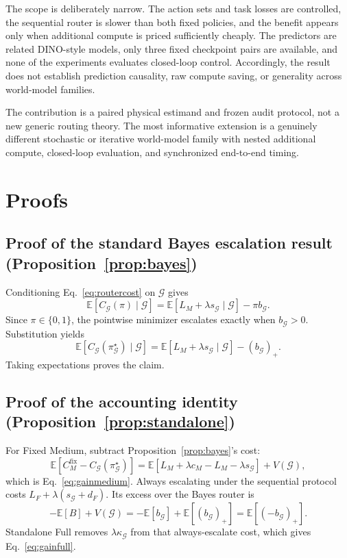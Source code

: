 \documentclass[10pt]{article}
\theoremstyle{definition}
\theoremstyle{remark}
\newcommand{\E}{\mathbb{E}}
\newcommand{\G}{\mathcal{G}}
\newcommand{\pos}[1]{\left(#1\right)_{+}}
\begin{document}
The scope is deliberately narrow.  The action sets and task losses are
controlled, the sequential router is slower than both fixed policies, and the
benefit appears only when additional compute is priced sufficiently cheaply.
The predictors are related DINO-style models, only three fixed checkpoint pairs
are available, and none of the experiments evaluates closed-loop control.
Accordingly, the result does not establish prediction causality, raw compute
saving, or generality across world-model families.

The contribution is a paired physical estimand and frozen audit protocol, not a
new generic routing theory.  The most informative extension is a genuinely
different stochastic or iterative world-model family with nested additional
compute, closed-loop evaluation, and synchronized end-to-end timing.
\clearpage
\appendix

\section{Proofs}

\subsection{Proof of the standard Bayes escalation result (Proposition~\ref{prop:bayes})}
Conditioning Eq.~\eqref{eq:routercost} on $\G$ gives
\[
 \E[C_{\G}(\pi)\mid\G]
 =
 \E[L_M+\lambda s_{\G}\mid\G]-\pi b_{\G}.
\]
Since $\pi\in\{0,1\}$, the pointwise minimizer escalates exactly when
$b_{\G}>0$.  Substitution yields
\[
 \E[C_{\G}(\pi^\star_{\G})\mid\G]
 =
 \E[L_M+\lambda s_{\G}\mid\G]-\pos{b_{\G}}.
\]
Taking expectations proves the claim.

\subsection{Proof of the accounting identity (Proposition~\ref{prop:standalone})}
For Fixed Medium, subtract Proposition~\ref{prop:bayes}'s cost:
\[
\E[C_M^{\mathrm{fix}}-C_{\G}(\pi^\star_{\G})]
=
\E[L_M+\lambda c_M-L_M-\lambda s_{\G}]+V(\G),
\]
which is Eq.~\eqref{eq:gainmedium}.  Always escalating under the sequential
protocol costs $L_F+\lambda(s_{\G}+d_F)$.  Its excess over the Bayes router is
\[
-\E[B]+V(\G)
=-\E[b_{\G}]+\E[\pos{b_{\G}}]
=\E[\pos{-b_{\G}}].
\]
Standalone Full removes $\lambda\kappa_{\G}$ from that always-escalate cost,
which gives Eq.~\eqref{eq:gainfull}.
\end{document}
